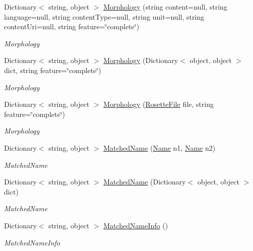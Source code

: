 \begin{DoxyCompactItemize}
Dictionary$<$ string, object $>$ \hyperlink{classrosette__api_1_1_c_a_p_i_a8ffe39cfe01a07dc1b67f2bc76b1f92d}{Morphology} (string content=null, string language=null, string content\+Type=null, string unit=null, string content\+Uri=null, string feature=\char`\"{}complete\char`\"{})
\begin{DoxyCompactList}\small\item\em Morphology \end{DoxyCompactList}\item 
Dictionary$<$ string, object $>$ \hyperlink{classrosette__api_1_1_c_a_p_i_a578e155f77e3baa51c56d38724567855}{Morphology} (Dictionary$<$ object, object $>$ dict, string feature=\char`\"{}complete\char`\"{})
\begin{DoxyCompactList}\small\item\em Morphology \end{DoxyCompactList}\item 
Dictionary$<$ string, object $>$ \hyperlink{classrosette__api_1_1_c_a_p_i_a57a341be212d74390da90a31c7b65e94}{Morphology} (\hyperlink{classrosette__api_1_1_rosette_file}{Rosette\+File} file, string feature=\char`\"{}complete\char`\"{})
\begin{DoxyCompactList}\small\item\em Morphology \end{DoxyCompactList}\item 
Dictionary$<$ string, object $>$ \hyperlink{classrosette__api_1_1_c_a_p_i_a4348a323976b5686dc6fa613d085be86}{Matched\+Name} (\hyperlink{classrosette__api_1_1_name}{Name} n1, \hyperlink{classrosette__api_1_1_name}{Name} n2)
\begin{DoxyCompactList}\small\item\em Matched\+Name \end{DoxyCompactList}\item 
Dictionary$<$ string, object $>$ \hyperlink{classrosette__api_1_1_c_a_p_i_a379a8a3cb7b34a9f1a8e4e50f06f8eeb}{Matched\+Name} (Dictionary$<$ object, object $>$ dict)
\begin{DoxyCompactList}\small\item\em Matched\+Name \end{DoxyCompactList}\item 
Dictionary$<$ string, object $>$ \hyperlink{classrosette__api_1_1_c_a_p_i_a2da4ec1037afca2ca38624565dbb3cf5}{Matched\+Name\+Info} ()
\begin{DoxyCompactList}\small\item\em Matched\+Name\+Info \end{DoxyCompactList}\item 

\end{DoxyCompactItemize}
